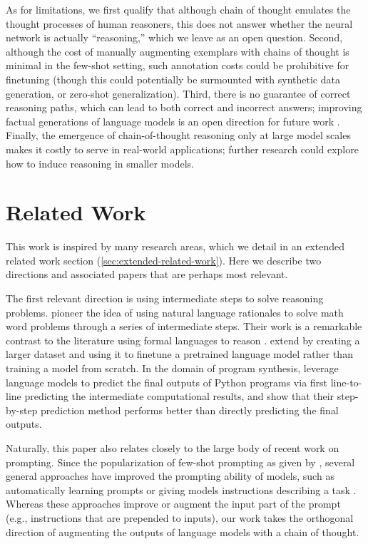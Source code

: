 As for limitations, we first qualify that although chain of thought emulates the thought processes of human reasoners, this does not answer whether the neural network is actually ``reasoning,'' which we leave as an open question. Second, although the cost of manually augmenting exemplars with chains of thought is minimal in the few-shot setting, such annotation costs could be prohibitive for finetuning (though this could potentially be surmounted with synthetic data generation, or zero-shot generalization). Third, there is no guarantee of correct reasoning paths, which can lead to both correct and incorrect answers; improving factual generations of language models is an open direction for future work \citep[][\textit{inter alia}]{rashkin2021measuring,ye2022unreliability,wiegreffe2021reframing}. Finally, the emergence of chain-of-thought reasoning only at large model scales makes it costly to serve in real-world applications; further research could explore how to induce reasoning in smaller models.

\section{Related Work} This work is inspired by many research areas, which we detail in an extended related work section (\ref{sec:extended-related-work}). Here we describe two directions and associated papers that are perhaps most relevant.

The first relevant direction is using intermediate steps to solve reasoning problems. \cite{ling-etal-2017-program} pioneer the idea of using natural language rationales to solve math word problems through a series of intermediate steps. Their work is a remarkable contrast to the literature using formal languages to reason \citep{roy-2016-reasoning, chiang-chen-2019-semantically, amini-etal-2019-mathqa, chen2019neural}.  \citet{cobbe2021training} extend \citet{ling-etal-2017-program} by creating a larger dataset and using it to finetune a pretrained language model rather than training a model from scratch. In the domain of program synthesis, \cite{nye2021show} leverage language models to predict the final outputs of Python programs via first line-to-line predicting the intermediate computational results, and show that their step-by-step prediction method performs better than directly predicting the final outputs.  

Naturally, this paper also relates closely to the large body of recent work on prompting. Since the popularization of few-shot prompting as given by \citet{brown2020language}, several general approaches have improved the prompting ability of models, such as automatically learning prompts \citep{lester-etal-2021-power} or giving models instructions describing a task \citep{wei2021finetuned,sanh2021multitask,ouyang2022training}. Whereas these approaches improve or augment the input part of the prompt (e.g., instructions that are prepended to inputs), our work takes the orthogonal direction of augmenting the outputs of language models with a chain of thought.

